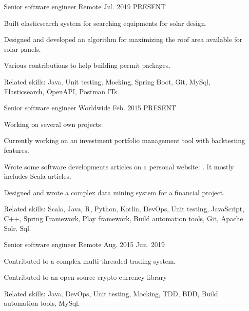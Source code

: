 

\begin{cventries}

  \cventry
    {Senior software engineer} %
    {} %
    {Remote} %
    {Jul. 2019 \textemdash{} PRESENT} %
    {
      \begin{cvitems}
      \item{Built elasticsearch system for searching equipments for solar design.}
      \item{Designed and developed an algorithm for maximizing the roof area available for solar panels.}
      \item{Various contributions to help building permit packages.}
      \end{cvitems}
      Related skills: Java, Unit testing, Mocking, Spring Boot, Git, MySql, Elasticsearch, OpenAPI, Postman ITs.
    }
    
  \cventry
    {Senior software engineer} %
    {} %
    {Worldwide} %
    {Feb. 2015 \textemdash{} PRESENT} %
    {    
    Working on several own projects:
      \begin{cvitems}
      \item{Currently working on an investment portfolio management tool with backtesting features.}
      \item{Wrote some software developments articles on a personal website: . It mostly includes Scala articles.}
      \item{Designed and wrote a complex data mining system for a financial project.}
      \end{cvitems}
      Related skills: Scala, Java, R, Python, Kotlin, DevOps, Unit testing, JavaScript, C++, Spring Framework, Play framework, Build automation tools, Git, Apache Solr, Sql.
    }
    
  \cventry
    {Senior software engineer} %
    {} %
    {Remote} %
    {Aug. 2015 \textemdash{} Jun. 2019} %
    {    
      \begin{cvitems}
      \item{Contributed to a complex multi-threaded trading system.}
      \item{Contributed to an open-source crypto currency library }
      \end{cvitems}
      Related skills: Java, DevOps, Unit testing, Mocking, TDD, BDD, Build automation tools, MySql.
    }
    

\end{cventries}
